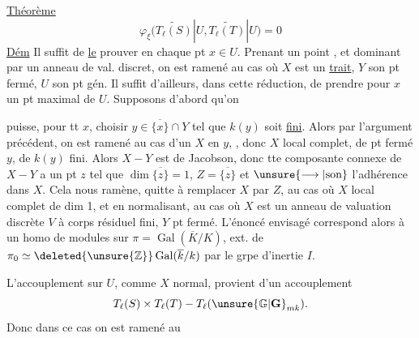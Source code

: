 \uline{Théorème}
\[
\varphi_\xi\bigl(\widetilde{T_\ell(S)}|U,\widetilde{T_\ell(T)}|U\bigr)=0
\]
\uline{Dém} Il suffit de \uline{le} prouver en chaque pt $x\in U$.
Prenant un point  , et dominant par un anneau de val. discret, on est ramené au cas où $X$ est un \uline{trait}, $Y$ son pt fermé, $U$ son pt gén. Il suffit d'ailleurs, dans cette réduction, de prendre pour $x$ un pt maximal de $U$. Supposons  d'abord qu'on

puisse, pour tt $x$, choisir $y\in\overline{\{x\}}\cap Y$ tel que $k(y)$ soit \uline{fini}.  Alors par l'argument précédent, on est ramené au cas d'un   $X$ en $y$, , donc $X$ local complet, de pt fermé $y$, de $k(y)$ fini. Alors $X-Y$ est de Jacobson, donc tte composante connexe de $X-Y$ a un pt $z$ tel que $\dim\overline{\{z\}}=1$, \uline{} $Z=\overline{\{z\}}$ et $\unsure{\longrightarrow|\text{son}}$ l'adhérence dans $X$. Cela nous ramène,  quitte à remplacer $X$ par $Z$, au cas où $X$ local complet de dim 1, et en normalisant, au cas où $X$ est  un anneau de valuation discrète $V$ à corps résiduel fini, $Y$ pt fermé. L'énoncé envisagé correspond alors à un homo de modules sur $\pi=\operatorname{Gal}(\overline K/K)$, ext. de $\pi_0\simeq\deleted{\unsure{\mathbb Z}}\operatorname{Gal}(\overline k/k)$  par le grpe d'inertie $I$.

L'accouplement sur $U$, comme $X$ normal, provient d'un accouplement
\[
T_\ell(S)\times T_\ell(T)\mathbin{-}T_\ell(\unsure{\mathbb G|\mathbf G}_{mk}).
\]
Donc dans ce cas on est ramené au

